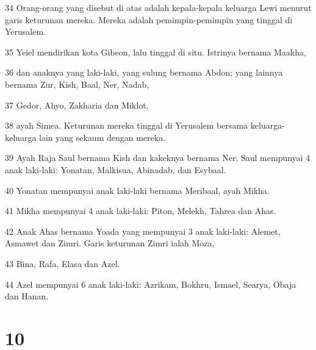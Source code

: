 \par 34 Orang-orang yang disebut di atas adalah kepala-kepala keluarga Lewi menurut garis keturunan mereka. Mereka adalah pemimpin-pemimpin yang tinggal di Yerusalem.
\par 35 Yeiel mendirikan kota Gibeon, lalu tinggal di situ. Istrinya bernama Maakha,
\par 36 dan anaknya yang laki-laki, yang sulung bernama Abdon; yang lainnya bernama Zur, Kish, Baal, Ner, Nadab,
\par 37 Gedor, Ahyo, Zakharia dan Miklot,
\par 38 ayah Simea. Keturunan mereka tinggal di Yerusalem bersama keluarga-keluarga lain yang sekaum dengan mereka.
\par 39 Ayah Raja Saul bernama Kish dan kakeknya bernama Ner. Saul mempunyai 4 anak laki-laki: Yonatan, Malkisua, Abinadab, dan Esybaal.
\par 40 Yonatan mempunyai anak laki-laki bernama Meribaal, ayah Mikha.
\par 41 Mikha mempunyai 4 anak laki-laki: Piton, Melekh, Tahrea dan Ahas.
\par 42 Anak Ahas bernama Yoada yang mempunyai 3 anak laki-laki: Alemet, Asmawet dan Zimri. Garis keturunan Zimri ialah Moza,
\par 43 Bina, Rafa, Elasa dan Azel.
\par 44 Azel mempunyai 6 anak laki-laki: Azrikam, Bokhru, Ismael, Searya, Obaja dan Hanan.

\chapter{10}

